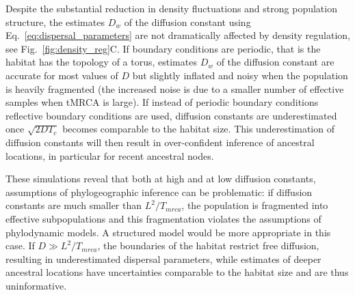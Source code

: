\documentclass[aps,rmp, twocolumn]{revtex4}
\begin{document}
Despite the substantial reduction in density fluctuations and strong population structure, the estimates $D_w$ of the diffusion constant using Eq.~\ref{eq:dispersal_parameters} are not dramatically affected by density regulation, see Fig.~\ref{fig:density_reg}C.
If boundary conditions are periodic, that is the habitat has the topology of a torus, estimates $D_w$ of the diffusion constant are accurate for most values of $D$ but slightly inflated and noisy  when the population is heavily fragmented (the increased noise is due to a smaller number of effective samples when tMRCA is large).
If instead of periodic boundary conditions reflective boundary conditions are used, diffusion constants are underestimated once $\sqrt{2DT_c}$ becomes comparable to the habitat size.
This underestimation of diffusion constants will then result in over-confident inference of ancestral locations, in particular for recent ancestral nodes.

These simulations reveal that both at high and at low diffusion constants, assumptions of phylogeographic inference can be problematic: if diffusion constants are much smaller than $L^2/T_{mrca}$, the population is fragmented into effective subpopulations and this fragmentation violates the assumptions of phylodynamic models.
A structured model would be more appropriate in this case.
If $D\gg L^2/T_{mrca}$, the boundaries of the habitat restrict free diffusion, resulting in underestimated dispersal parameters, while estimates of deeper ancestral locations have uncertainties comparable to the habitat size and are thus uninformative.
\end{document}
